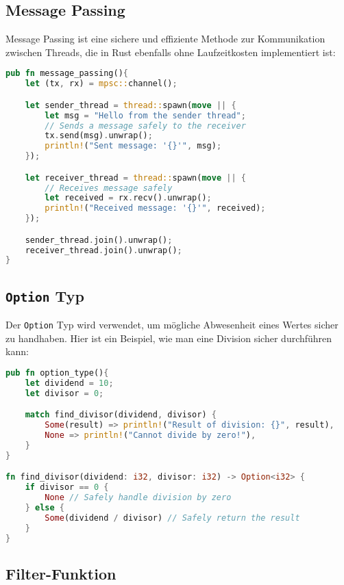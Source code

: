 \cleardoublepage
\subsection{Message Passing}

Message Passing ist eine sichere und effiziente Methode zur Kommunikation zwischen Threads, die in Rust ebenfalls ohne Laufzeitkosten implementiert ist:

\begin{lstlisting}[language=Rust, caption=Message Passing Beispiel]
pub fn message_passing(){
    let (tx, rx) = mpsc::channel();

    let sender_thread = thread::spawn(move || {
        let msg = "Hello from the sender thread";
        // Sends a message safely to the receiver
        tx.send(msg).unwrap(); 
        println!("Sent message: '{}'", msg);
    });

    let receiver_thread = thread::spawn(move || {
        // Receives message safely
        let received = rx.recv().unwrap(); 
        println!("Received message: '{}'", received);
    });

    sender_thread.join().unwrap();
    receiver_thread.join().unwrap();
}
\end{lstlisting}

\subsection{\texttt{Option} Typ}

Der \texttt{Option} Typ wird verwendet, um mögliche Abwesenheit eines Wertes sicher zu handhaben. Hier ist ein Beispiel, wie man eine Division sicher durchführen kann:

\begin{lstlisting}[language=Rust, caption=Option Typ Beispiel]
pub fn option_type(){
    let dividend = 10;
    let divisor = 0;

    match find_divisor(dividend, divisor) {
        Some(result) => println!("Result of division: {}", result),
        None => println!("Cannot divide by zero!"),
    }
}

fn find_divisor(dividend: i32, divisor: i32) -> Option<i32> {
    if divisor == 0 {
        None // Safely handle division by zero
    } else {
        Some(dividend / divisor) // Safely return the result
    }
}
\end{lstlisting}

\subsection{Filter-Funktion}

